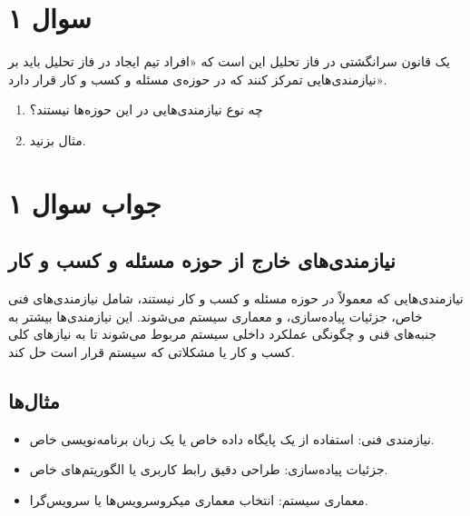 \section*{سوال ۱}

یک قانون سرانگشتی در فاز تحلیل این است که «افراد تیم ایجاد در فاز تحلیل باید بر نیازمندی‌هایی تمرکز کنند که در حوزه‌ی مسئله و کسب و کار قرار دارد».
\begin{enumerate}
	\item چه نوع نیازمندی‌هایی در این حوزه‌ها نیستند؟
	\item مثال بزنید.
\end{enumerate}

\section*{جواب سوال ۱}

\subsection{نیازمندی‌های خارج از حوزه مسئله و کسب و کار}
نیازمندی‌هایی که معمولاً در حوزه مسئله و کسب و کار نیستند، شامل نیازمندی‌های فنی خاص، جزئیات پیاده‌سازی، و معماری سیستم می‌شوند. این نیازمندی‌ها بیشتر به جنبه‌های فنی و چگونگی عملکرد داخلی سیستم مربوط می‌شوند تا به نیازهای کلی کسب و کار یا مشکلاتی که سیستم قرار است حل کند.

\subsection{مثال‌ها}
\begin{itemize}
	\item نیازمندی فنی: استفاده از یک پایگاه داده خاص یا یک زبان برنامه‌نویسی خاص.
	\item جزئیات پیاده‌سازی: طراحی دقیق رابط کاربری یا الگوریتم‌های خاص.
	\item معماری سیستم: انتخاب معماری میکروسرویس‌ها یا سرویس‌گرا.
\end{itemize}